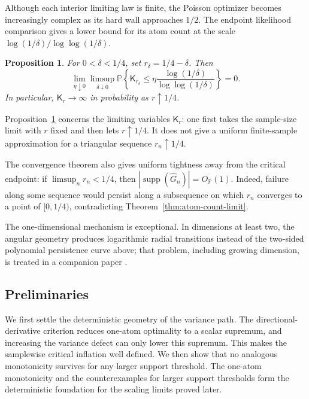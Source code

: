 \documentclass[11pt]{article}
\newtheorem{proposition}[theorem]{Proposition}
\theoremstyle{definition}
\numberwithin{equation}{section}
\newcommand{\Pbb}{\mathbb{P}}
\newcommand{\wh}{\widehat}
\DeclareMathOperator{\supp}{supp}
\begin{document}
Although each interior limiting law is finite, the Poisson optimizer becomes
increasingly complex as its hard wall approaches \(1/2\). The endpoint
likelihood comparison gives a lower bound for its atom count at the scale
\(\log(1/\delta)/\log\log(1/\delta)\).
\begin{proposition}
\label{prop:atom-count-endpoint-divergence}
For \(0<\delta<1/4\), set \(r_\delta=1/4-\delta\). Then
\[
    \lim_{\eta\downarrow0}\limsup_{\delta\downarrow0}
    \Pbb\left\{
       \mathsf K_{r_\delta}
       \le \eta\frac{\log(1/\delta)}{\log\log(1/\delta)}
    \right\}=0.
\]
In particular, \(\mathsf K_r\to\infty\) in probability as
\(r\uparrow1/4\).
\end{proposition}

Proposition~\ref{prop:atom-count-endpoint-divergence} concerns the limiting
variables \(\mathsf K_r\): one first takes the sample-size limit with \(r\)
fixed and then lets \(r\uparrow1/4\). It does not give a uniform
finite-sample approximation for a triangular sequence \(r_n\uparrow1/4\).

The convergence theorem also gives uniform tightness away from the critical
endpoint: if \(\limsup_n r_n<1/4\), then
\(|\supp(\wh G_n)|=O_{\mathbb P}(1)\). Indeed, failure along some sequence
would persist along a subsequence on which \(r_n\) converges to a point of
\([0,1/4)\), contradicting Theorem~\ref{thm:atom-count-limit}.

The one-dimensional mechanism is exceptional. In dimensions at least two,
the angular geometry produces logarithmic radial transitions instead of the
two-sided polynomial persistence curve above; that problem, including growing
dimension, is treated in a companion paper
\cite{varianceMultivariateCompanion}.

\subsection{Preliminaries}

We first settle the deterministic geometry of the variance path. The
directional-derivative criterion reduces one-atom optimality to a scalar
supremum, and increasing the variance defect can only lower this supremum.
This makes the samplewise critical inflation well defined. We then show that
no analogous monotonicity survives for any larger support threshold. The
one-atom monotonicity and the counterexamples for larger support thresholds
form the deterministic foundation for the scaling limits proved later.
\end{document}
